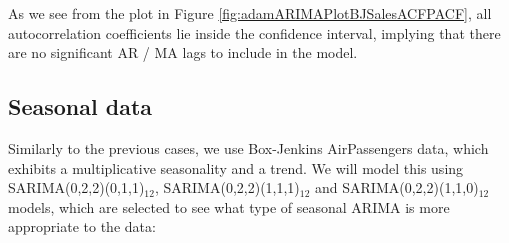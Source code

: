 \documentclass[
]{book}
\theoremstyle{definition}
\theoremstyle{definition}
\theoremstyle{definition}
\theoremstyle{definition}
\theoremstyle{remark}
\begin{document}
As we see from the plot in Figure \ref{fig:adamARIMAPlotBJSalesACFPACF}, all autocorrelation coefficients lie inside the confidence interval, implying that there are no significant AR / MA lags to include in the model.

\hypertarget{ARIMAExampleInRSeasonal}{%
\subsection{Seasonal data}\label{ARIMAExampleInRSeasonal}}

Similarly to the previous cases, we use Box-Jenkins AirPassengers data, which exhibits a multiplicative seasonality and a trend. We will model this using SARIMA(0,2,2)(0,1,1)\(_{12}\), SARIMA(0,2,2)(1,1,1)\(_{12}\) and SARIMA(0,2,2)(1,1,0)\(_{12}\) models, which are selected to see what type of seasonal ARIMA is more appropriate to the data:
\end{document}
